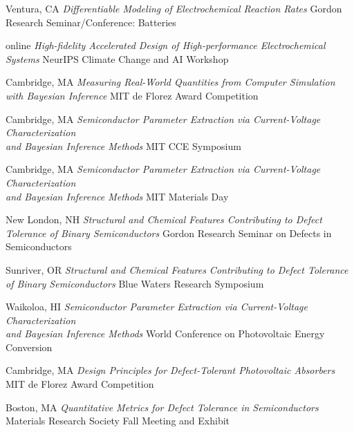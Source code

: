     {Ventura, CA}
    {\textit{Differentiable Modeling of Electrochemical Reaction Rates}}
    {Gordon Research Seminar/Conference: Batteries}

\vspace{-2mm}
    {online}
    {\textit{High-fidelity Accelerated Design of High-performance Electrochemical Systems}}
    {NeurIPS Climate Change and AI Workshop}

\vspace{-2mm}
    {Cambridge, MA}
    {\textit{Measuring Real-World Quantities from Computer Simulation with Bayesian Inference}}
    {MIT de Florez Award Competition}

\vspace{-2mm}
\datedsubsection{}
    {Cambridge, MA}
    {\textit{Semiconductor Parameter Extraction via Current-Voltage Characterization \\and Bayesian Inference Methods}}
    {MIT CCE Symposium}

\vspace{-2mm}
    {Cambridge, MA}
    {\textit{Semiconductor Parameter Extraction via Current-Voltage Characterization \\and Bayesian Inference Methods}}
    {MIT Materials Day}

\vspace{-2mm}
\datedsubsection{}
    {New London, NH}
    {\textit{Structural and Chemical Features Contributing to Defect Tolerance of Binary Semiconductors}}
    {Gordon Research Seminar on Defects in Semiconductors}

\vspace{-2mm}
\datedsubsection{}
    {Sunriver, OR}
    {\textit{Structural and Chemical Features Contributing to Defect Tolerance of Binary Semiconductors}}
    {Blue Waters Research Symposium}

\vspace{-2mm}
\datedsubsection{}
    {Waikoloa, HI}
    {\textit{Semiconductor Parameter Extraction via Current-Voltage Characterization \\and Bayesian Inference Methods}}
    {World Conference on Photovoltaic Energy Conversion}

\vspace{-2mm}
\datedsubsection{}
    {Cambridge, MA}
    {\textit{Design Principles for Defect-Tolerant Photovoltaic Absorbers}}
    {MIT de Florez Award Competition}

\vspace{-2mm}
    {Boston, MA}
    {\textit{Quantitative Metrics for Defect Tolerance in Semiconductors}}
    {Materials Research Society Fall Meeting and Exhibit}

